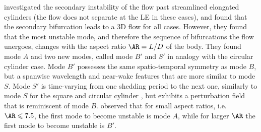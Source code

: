 %
\cite{ryan-thompson-hourigan-2005} investigated the secondary instability of the flow past streamlined elongated cylinders (the flow does not separate at the LE in these cases), and found that the secondary bifurcation leads to a 3D flow for all cases. However, they found that the most unstable mode, and therefore the sequence of bifurcations the flow unergoes, changes with the aspect ratio $\AR=L/D$ of the body. They found mode $A$ and two new modes, called mode $B'$ and $S'$ in analogy with the circular cylinder case. Mode $B'$ possesses the same spatio-temporal symmetry as mode $B$, but a spanwise wavelength and near-wake features that are more similar to mode $S$. Mode $S'$ is time-varying from one shedding period to the next one, similarly to mode $S$ for the square and circular cylinder \citep{robichaux-balachandar-vanka-1999}, but exhibits a perturbation field that is reminiscent of mode $B$. \cite{ryan-thompson-hourigan-2005} observed that for small aspect ratios, i.e. $\AR \le 7.5$, the first mode to become unstable is mode $A$, while for larger $\AR$ the first mode to become unstable is $B'$. 

